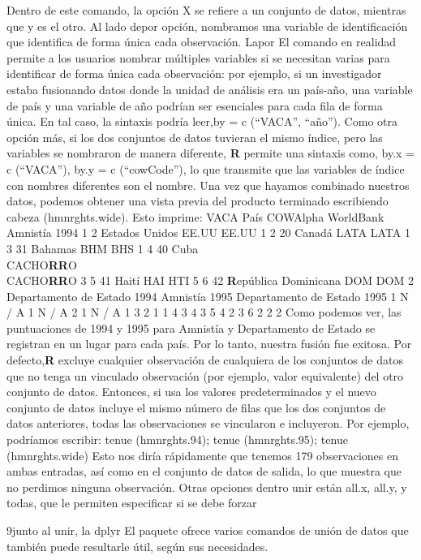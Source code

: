 \documentclass[
]{book}
\begin{document}
Dentro de este comando, la opción X se refiere a un conjunto de datos, mientras que y es el otro. Al lado depor opción, nombramos una variable de identificación que identifica de forma única cada observación. Lapor El comando en realidad permite a los usuarios nombrar múltiples variables si se necesitan varias para identificar de forma única cada observación: por ejemplo, si un investigador estaba fusionando datos donde la unidad de análisis era un país-año, una variable de país y una variable de año podrían ser esenciales para cada fila de forma única. En tal caso, la sintaxis podría leer,by = c (``VACA'', ``año''). Como otra opción más, si los dos conjuntos de datos tuvieran el mismo índice, pero las variables se nombraron de manera diferente,
\textbf{R} permite una sintaxis como, by.x = c (``VACA''), by.y = c (``cowCode''), lo que transmite
que las variables de índice con nombres diferentes son el nombre.
Una vez que hayamos combinado nuestros datos, podemos obtener una vista previa del producto terminado escribiendo
cabeza (hmnrghts.wide). Esto imprime:
VACA País COWAlpha WorldBank Amnistía 1994
1 2 Estados Unidos EE.UU EE.UU 1
2 20 Canadá LATA LATA 1
3 31 Bahamas BHM BHS 1
4 40 Cuba\\
CACHO\textbf{RR}O\\
CACHO\textbf{RR}O 3
5 41 Haití HAI HTI 5
6 42 \textbf{R}epública Dominicana DOM DOM 2
Departamento de Estado 1994 Amnistía 1995 Departamento de Estado 1995
1 N / A 1 N / A
2 1 N / A 1
3 2 1 1
4 3 4 3
5 4 2 3
6 2 2 2
Como podemos ver, las puntuaciones de 1994 y 1995 para Amnistía y Departamento de Estado se registran en un lugar para cada país. Por lo tanto, nuestra fusión fue exitosa. Por defecto,\textbf{R}
excluye cualquier observación de cualquiera de los conjuntos de datos que no tenga un vinculado observación (por ejemplo, valor equivalente) del otro conjunto de datos. Entonces, si usa los valores predeterminados y el nuevo conjunto de datos incluye el mismo número de filas que los dos conjuntos de datos anteriores, todas las observaciones se vincularon e incluyeron. Por ejemplo, podríamos escribir:
tenue (hmnrghts.94); tenue (hmnrghts.95); tenue (hmnrghts.wide)
Esto nos diría rápidamente que tenemos 179 observaciones en ambas entradas, así como en el conjunto de datos de salida, lo que muestra que no perdimos ninguna observación. Otras opciones dentro
unir están all.x, all.y, y todas, que le permiten especificar si se debe forzar

9junto al unir, la dplyr El paquete ofrece varios comandos de unión de datos que también puede resultarle útil, según sus necesidades.
\end{document}
